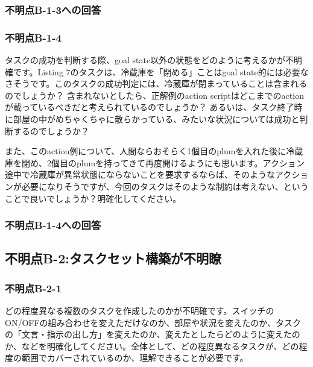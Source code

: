 \documentclass{jsarticle}
\begin{document}
\subsubsection*{不明点B-1-3への回答}

\subsubsection*{不明点B-1-4}
\begin{screen}
タスクの成功を判断する際、goal state以外の状態をどのように考えるかが不明確です。Listing 7のタスクは、冷蔵庫を「閉める」ことはgoal state的には必要なさそうです。このタスクの成功判定には、冷蔵庫が閉まっていることは含まれるのでしょうか？ 含まれないとしたら、正解例のaction scriptはどこまでのactionが載っているべきだと考えられているのでしょうか？ あるいは、タスク終了時に部屋の中がめちゃくちゃに散らかっている、みたいな状況については成功と判断するのでしょうか？

また、このaction例について、人間ならおそらく1個目のplumを入れた後に冷蔵庫を閉め、2個目のplumを持ってきて再度開けるようにも思います。アクション途中で冷蔵庫が異常状態にならないことを要求するならば、そのようなアクションが必要になりそうですが、今回のタスクはそのような制約は考えない、ということで良いでしょうか？明確化してください。
\end{screen}

\subsubsection*{不明点B-1-4への回答}

\subsection*{不明点B-2:タスクセット構築が不明瞭}
\subsubsection*{不明点B-2-1}
\begin{screen}
どの程度異なる複数のタスクを作成したのかが不明確です。スイッチのON/OFFの組み合わせを変えただけなのか、部屋や状況を変えたのか、タスクの「文言・指示の出し方」を変えたのか、変えたとしたらどのように変えたのか、などを明確化してください。全体として、どの程度異なるタスクが、どの程度の範囲でカバーされているのか、理解できることが必要です。
\end{screen}
\end{document}
